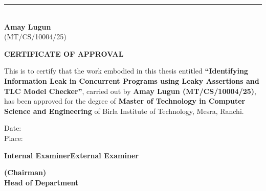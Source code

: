 \documentclass[a4paper,12pt]{report}
\newcommand{\thesistitle}{Identifying Information Leak in Concurrent Programs using Leaky Assertions and TLC Model Checker}
\newcommand{\authorname}{Amay Lugun}
\newcommand{\rollnumber}{MT/CS/10004/25}
\newcommand{\degreename}{Master of Technology}
\newcommand{\departmentname}{Computer Science and Engineering}
\begin{document}
    \vspace{2.4cm}

    \noindent\hfill
    \begin{minipage}[t]{6.0cm}
        \centering
        \rule{5.2cm}{0.9pt}\\[0.15cm]
        \textbf{\authorname}\\
        (\rollnumber)
    \end{minipage}
\endgroup

\clearpage
\thispagestyle{empty}
\begingroup
    \fontsize{12}{16}\selectfont

    \vspace*{0.8cm}
    \begin{center}
        {\fontsize{16}{22}\selectfont \textbf{CERTIFICATE OF APPROVAL}\par}
    \end{center}

    \vspace{1.2cm}

    \noindent
    This is to certify that the work embodied in this thesis entitled \textbf{``\thesistitle''}, carried out by \textbf{\authorname{} (\rollnumber)}, has been approved for the degree of \textbf{\degreename{} in \departmentname} of Birla Institute of Technology, Mesra, Ranchi.

    \vspace{1.5cm}

    \noindent Date:\\[0.35cm]
    \noindent Place:

    \vspace{2.8cm}

    \noindent\textbf{Internal Examiner}\hfill\textbf{External Examiner}

    \vspace{3.0cm}

    \begin{center}
        \textbf{(Chairman)}\\
        \textbf{Head of Department}
    \end{center}
\endgroup

\clearpage
{}
\setcounter{page}{1}
\pagestyle{plain}
{}
\begingroup
    \onehalfspacing
    \normalsize
\end{document}
